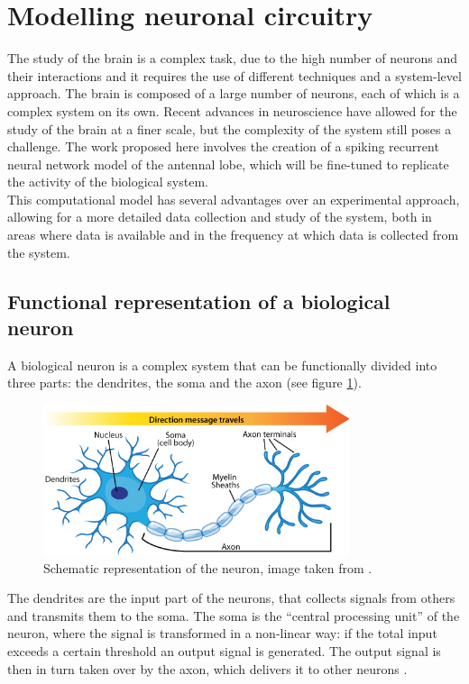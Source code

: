 \section{Modelling neuronal circuitry}
The study of the brain is a complex task, due to the high number of neurons and their interactions and it requires the use of different techniques and a system-level approach.
The brain is composed of a large number of neurons, each of which is a complex system on its own.
Recent advances in neuroscience have allowed for the study of the brain at a finer scale, but the complexity of the system still poses a challenge.
The work proposed here involves the creation of a spiking recurrent neural network model of the antennal lobe, which will be fine-tuned to replicate the activity of the biological system.\\
This computational model has several advantages over an experimental approach, allowing for a more detailed data collection and study of the system, both in areas where data is available and in the frequency at which data is collected from the system.

  \subsection{Functional representation of a biological neuron}
  A biological neuron is a complex system that can be functionally divided into three parts: the dendrites, the soma and the axon (see figure \ref{fig:neuron-anatomy}).

  \begin{figure}
    \centering
    \includegraphics[width=0.8\textwidth]{neuron_anatomy}
    \caption{Schematic representation of the neuron, image taken from \cite{neuron-anatomy-schema}.}
    \label{fig:neuron-anatomy}
  \end{figure}

  The dendrites are the input part of the neurons, that collects signals from others and transmits them to the soma.
  The soma is the ``central processing unit'' of the neuron, where the signal is transformed in a non-linear way: if the total input exceeds a certain threshold an output signal is generated.
  The output signal is then in turn taken over by the axon, which delivers it to other neurons \cite{neuronal-dynamics}.

